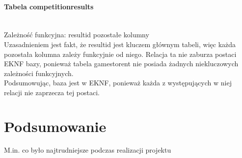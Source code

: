 \documentclass{article}
\begin{document}
	\paragraph{Tabela competition\textunderscore results}\mbox{}\vspace{0.2cm} \\
	Zależność funkcyjna: result\textunderscore id\mbox{} \textrightarrow \mbox{} pozostałe kolumny \vspace{0.2cm} \\
	\noindent Uzasadnieniem jest fakt, że result\textunderscore id jest kluczem głównym tabeli, więc każda pozostała kolumna zależy funkcyjnie od niego. Relacja ta nie zaburza postaci EKNF bazy, ponieważ tabela games\textunderscore to\textunderscore rent nie posiada żadnych niekluczowych zależności funkcyjnych.\\
	
	Podsumowując, baza jest w EKNF, ponieważ każda z występujących w niej relacji nie zaprzecza tej postaci.
	
	\section{Podsumowanie}
	M.in. co było najtrudniejsze podczas realizacji projektu
	
\end{document}
